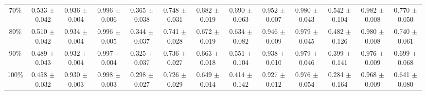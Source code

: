 \documentclass[11pt]{article}
\begin{document}
\begin{table}[ht]
{\begin{tabular}{ccccccccccccc}
70\% & 0.533 $\pm$ 0.042 & 0.936 $\pm$ 0.004 & 0.996 $\pm$ 0.006 & 0.365 $\pm$ 0.038 & 0.748 $\pm$ 0.031 & 0.682 $\pm$ 0.019 & 0.690 $\pm$ 0.063 & 0.952 $\pm$ 0.007 & 0.980 $\pm$ 0.043 & 0.542 $\pm$ 0.104 & 0.982 $\pm$ 0.008 & 0.770 $\pm$ 0.050 \\
80\% & 0.510 $\pm$ 0.042 & 0.934 $\pm$ 0.004 & 0.996 $\pm$ 0.005 & 0.344 $\pm$ 0.037 & 0.741 $\pm$ 0.028 & 0.672 $\pm$ 0.019 & 0.634 $\pm$ 0.082 & 0.946 $\pm$ 0.009 & 0.979 $\pm$ 0.045 & 0.482 $\pm$ 0.126 & 0.980 $\pm$ 0.008 & 0.740 $\pm$ 0.061 \\
90\% & 0.489 $\pm$ 0.043 & 0.932 $\pm$ 0.004 & 0.997 $\pm$ 0.004 & 0.325 $\pm$ 0.037 & 0.736 $\pm$ 0.027 & 0.663 $\pm$ 0.018 & 0.551 $\pm$ 0.104 & 0.938 $\pm$ 0.010 & 0.979 $\pm$ 0.046 & 0.399 $\pm$ 0.141 & 0.976 $\pm$ 0.009 & 0.699 $\pm$ 0.068 \\
100\% & 0.458 $\pm$ 0.032 & 0.930 $\pm$ 0.003 & 0.998 $\pm$ 0.003 & 0.298 $\pm$ 0.027 & 0.726 $\pm$ 0.029 & 0.649 $\pm$ 0.014 & 0.414 $\pm$ 0.142 & 0.927 $\pm$ 0.012 & 0.976 $\pm$ 0.054 & 0.284 $\pm$ 0.164 & 0.968 $\pm$ 0.009 & 0.641 $\pm$ 0.080 \\
\bottomrule
\end{tabular}
}
\end{table}

\clearpage
\end{document}
